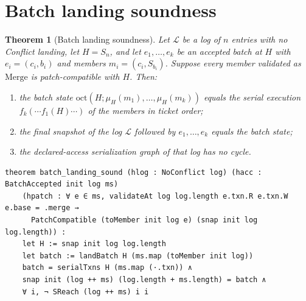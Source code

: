 \documentclass[11pt,letterpaper]{article}
\newtheorem{theorem}{Theorem}[section]
\theoremstyle{definition}
\theoremstyle{remark}
\newcommand{\Snap}[1]{S_{#1}}
\newcommand{\Log}{\mathcal{L}}
\newcommand{\op}[1]{\mathrm{#1}}
\newcommand{\oct}{\op{oct}}
\newcommand{\Mg}{\mathrm{Merge}}
\begin{document}
\section{Batch landing soundness}
\label{sec:mcbl:batch}

\begin{theorem}[Batch landing soundness]
\label{thm:mcbl:sound}
Let $\Log$ be a log of $n$ entries with no Conflict landing, let $H=\Snap{n}$, and let $e_1,\dots,e_k$ be an accepted batch at $H$ with $e_i=(c_i,b_i)$ and members $m_i=(c_i,\Snap{b_i})$. Suppose every member validated as $\Mg$ is patch-compatible with $H$. Then:
\begin{enumerate}
\item the batch state $\oct(H;\mu_H(m_1),\dots,\mu_H(m_k))$ equals the serial execution $f_k(\cdots f_1(H)\cdots)$ of the members in ticket order;
\item the final snapshot of the log $\Log$ followed by $e_1,\dots,e_k$ equals the batch state;
\item the declared-access serialization graph of that log has no cycle.
\end{enumerate}
\end{theorem}

\begin{lstlisting}[language=Lean,caption={Batch landing soundness (\texttt{YonedaTx/Soundness.lean})},label={lst:mcbl:sound}]
theorem batch_landing_sound (hlog : NoConflict log) (hacc : BatchAccepted init log ms)
    (hpatch : ∀ e ∈ ms, validateAt log log.length e.txn.R e.txn.W e.base = .merge →
      PatchCompatible (toMember init log e) (snap init log log.length)) :
    let H := snap init log log.length
    let batch := landBatch H (ms.map (toMember init log))
    batch = serialTxns H (ms.map (·.txn)) ∧
    snap init (log ++ ms) (log.length + ms.length) = batch ∧
    ∀ i, ¬ SReach (log ++ ms) i i
\end{lstlisting}
\end{document}
